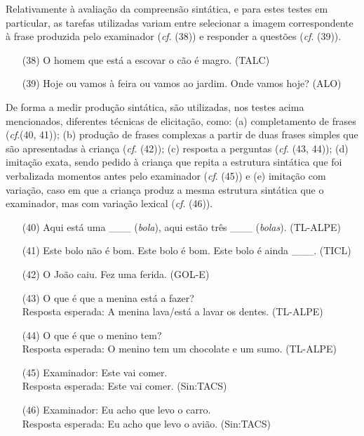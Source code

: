 \documentclass[output=paper,colorlinks,citecolor=brown,booklanguage=portuguese]{langscibook}
\begin{document}
Relativamente à avaliação da compreensão sintática, e para estes testes em particular, as tarefas utilizadas variam entre selecionar a imagem correspondente à frase produzida pelo examinador (\emph{cf}. (38)) e responder a questões (\emph{cf}. (39)).

\begin{enumerate}[align=left]
    \item [(38)] O homem que está a escovar o cão é magro. (TALC)
\item[(39)] 	Hoje ou vamos à feira ou vamos ao jardim. Onde vamos hoje? (ALO)
\end{enumerate}

De forma a medir produção sintática, são utilizadas, nos testes acima mencionados, diferentes técnicas de elicitação, como: (a) completamento de frases (\emph{cf}.(40, 41)); (b) produção de frases complexas a partir de duas frases simples que são apresentadas à criança (\emph{cf}. (42)); (c) resposta a perguntas (\emph{cf}. (43, 44)); (d) imitação exata, sendo pedido à criança que repita a estrutura sintática que foi verbalizada momentos antes pelo examinador (\emph{cf}. (45)) e (e) imitação com variação, caso em que a criança produz a mesma estrutura sintática que o examinador, mas com variação lexical (\emph{cf}. (46)). 

\begin{enumerate}[align=left]
    \item [(40)] 	Aqui está uma \_\_\_ (\emph{bola}), aqui estão três \_\_\_ (\emph{bolas}). (TL-ALPE)
\item[(41)] 	Este bolo não é bom. Este bolo é bom. Este bolo é ainda \_\_\_. (TICL)
\item[(42)] 	O João caiu. Fez uma ferida. (GOL-E)
\item[(43)] 	O que é que a menina está a fazer? \\
	Resposta esperada: A menina lava/está a lavar os dentes. (TL-ALPE)
\item[(44)] 	O que é que o menino tem? \\
	Resposta esperada: O menino tem um chocolate e um sumo. (TL-ALPE)
\item[(45)] 	Examinador: Este vai comer. \\
	Resposta esperada: Este vai comer. (Sin:TACS)
\item[(46)] 	Examinador: Eu acho que levo o carro. \\
	Resposta esperada: Eu acho que levo o avião. (Sin:TACS)
\end{enumerate}
\end{document}
